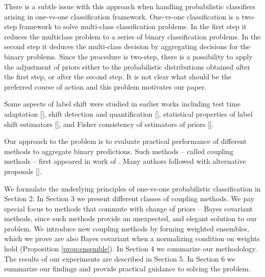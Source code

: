 There is a subtle issue with this approach  when handling probabilistic classifiers arising in one-vs-one classification framework.   One-vs-one classification is a two-step framework to solve  multi-class classification problems. In the first step it reduces the multiclass problem to a series of binary classification problems. In the second step it deduces the multi-class decision by aggregating decisions for the binary problems. Since the procedure is two-step, there is a possibility to apply the adjustment of priors either to the probabilistic distributions obtained after the first step, or after the second step. It is not clear what should be the preferred course of action and this problem motivates our paper. 

Some aspects of label shift were studied in earlier works including test time adaptation
[\cite{vsipka2022hitchhiker}], shift detection and quantification [\cite{lipton2018detecting}], statistical properties of label shift estimators [\cite{garg2020unified}], and Fisher consistency of estimators of priors [\cite{tasche2017fisher}].


Our approach to the problem is to evaluate practical performance of different methods to aggregate binary predictions. Such methods -- called coupling methods -- first appeared in work of \cite{refregier1991probabilistic}. Many authors followed with alternative proposals [\cite{price1994pairwise, hastie1998classification,  zahorian1999partitioned, wu2004probability, vsuch2015new, vsuch2016bayes}].

We formulate the underlying principles of one-vs-one probabilistic classification in Section 2. In Section 3 we present  different classes of coupling methods. We pay special focus to methods that commute with change of priors -- Bayes covariant methods, since such methods provide an unexpected, and elegant solution to our problem. We introduce new coupling methods by forming weighted ensembles, which we prove are also Bayes covariant when a normalizing condition on weights hold (Proposition \ref{prop:ensemble}).  In Section 4 we summarize our methodology. The results of our experiments are described in Section 5. In Section 6 we summarize our findings and provide practical guidance to solving the problem.